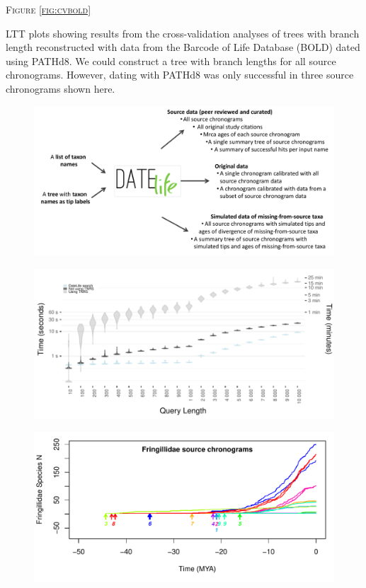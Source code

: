 \documentclass[]{article}
\begin{document}
\begin{center}
\textsc{Figure \ref{fig:cvbold}}
\end{center}
LTT plots showing results from the cross-validation analyses of trees with branch length reconstructed with data from the Barcode of Life Database (BOLD) dated using PATHd8. We could construct a tree with branch lengths for all source chronograms. However, dating with PATHd8 was only successful in three source chronograms shown here.

\newpage

\begin{figure}[!h]
\includegraphics{Fig1.pdf}
\caption{}
\label{fig:workflow}
\end{figure}

\newpage

\begin{figure}[!h]
\includegraphics[width=1\linewidth]{fig_runtime1.pdf}
\caption{}
\label{fig:runtime1}
\end{figure}

\newpage

\begin{figure}[!h]
\includegraphics[width=1\linewidth]{fig_schronograms1.pdf}
\caption{}
\label{fig:schronograms1}
\end{figure}
\end{document}
